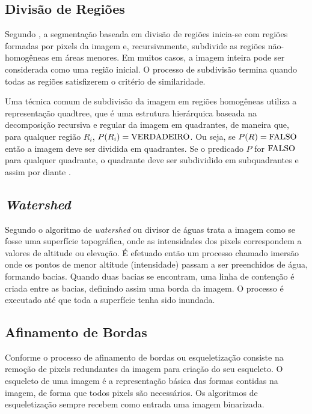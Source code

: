 \documentclass[12pt,oneside,a4paper,english,french,spanish,brazil,]{abntex2}
\begin{document}

\subsection{Divisão de Regiões}

Segundo \citet{pedrini:2008}, a segmentação baseada em divisão de regiões inicia-se com regiões formadas por pixels da imagem e, recursivamente, subdivide as regiões não-homogêneas em áreas menores. Em muitos casos, a imagem inteira pode ser considerada como uma região inicial. O processo de subdivisão termina quando todas as regiões satisfizerem o critério de similaridade.

Uma técnica comum de subdivisão da imagem em regiões homogêneas utiliza a representação quadtree, que é uma estrutura hierárquica baseada na decomposição recursiva e regular da imagem em quadrantes, de maneira que, para qualquer região \(R_i\), \(P(R_i) = \textup{VERDADEIRO}\). Ou seja, se \(P(R) = \textup{FALSO}\) então a imagem deve ser dividida em quadrantes. Se o predicado \(P\) for \(\textup{FALSO}\) para qualquer quadrante, o quadrante deve ser subdividido em subquadrantes e assim por diante \cite{pedrini:2008}.

\subsection{\textit{Watershed}}

Segundo \citet{pedrini:2008} o algoritmo de \textit{watershed} ou divisor de águas trata a imagem como se fosse uma superfície topográfica, onde as intensidades dos pixels correspondem a valores de altitude ou elevação. É efetuado então um processo chamado imersão onde os pontos de menor altitude (intensidade) passam a ser preenchidos de água, formando bacias. Quando duas bacias se encontram, uma linha de contenção é criada entre as bacias, definindo assim uma borda da imagem. O processo é executado até que toda a superfície tenha sido inundada.


\subsection{Afinamento de Bordas}

Conforme \citet{guilherme:2007} o processo de afinamento de bordas ou esqueletização consiste na remoção de pixels redundantes da imagem para criação do seu esqueleto. O esqueleto de uma imagem é a representação básica das formas contidas na imagem, de forma que todos pixels são necessários. Os algoritmos de esqueletização sempre recebem como entrada uma imagem binarizada.
\end{document}
